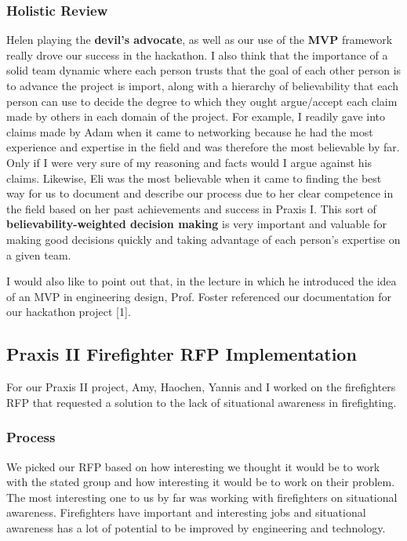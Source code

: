 \documentclass[a4paper,12pt]{article}
\begin{document}
\subsubsection{Holistic Review}

Helen playing the \textbf{devil’s advocate}, as well as our use of the \textbf{MVP} framework really drove our success in the hackathon. I also think that the importance of a solid team dynamic where each person trusts that the goal of each other person is to advance the project is import, along with a hierarchy of believability that each person can use to decide the degree to which they ought argue/accept each claim made by others in each domain of the project. For example, I readily gave into claims made by Adam when it came to networking because he had the most experience and expertise in the field and was therefore the most believable by far. Only if I were very sure of my reasoning and facts would I argue against his claims. Likewise, Eli was the most believable when it came to finding the best way for us to document and describe our process due to her clear competence in the field based on her past achievements and success in Praxis I. This sort of \textbf{believability-weighted decision making} is very important and valuable for making good decisions quickly and taking advantage of each person’s expertise on a given team.

I would also like to point out that, in the lecture in which he introduced the idea of an MVP in engineering design, Prof. Foster referenced our documentation for our hackathon project [1].

\subsection{Praxis II Firefighter RFP Implementation}
For our Praxis II project, Amy, Haochen, Yannis and I worked on the firefighters RFP that requested a solution to the lack of situational awareness in firefighting.

\subsubsection{Process}
We picked our RFP based on how interesting we thought it would be to work with the stated group and how interesting it would be to work on their problem. The most interesting one to us by far was working with firefighters on situational awareness. Firefighters have important and interesting jobs and situational awareness has a lot of potential to be improved by engineering and technology.
\end{document}
